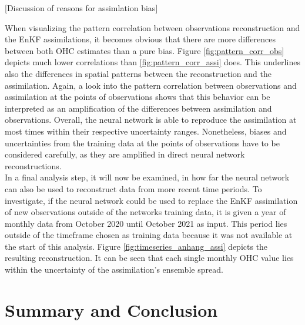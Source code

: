 \documentclass[11pt,a4paper]{scrreprt}	%
\begin{document}
	[Discussion of reasons for assimlation bias]
	
	When visualizing the pattern correlation between observations reconstruction and the EnKF assimilations, it becomes obvious that there are more differences between both OHC estimates than a pure bias. Figure \ref{fig:pattern_corr_obs} depicts much lower correlations than \ref{fig:pattern_corr_assi} does. This underlines also the differences in spatial patterns between the reconstruction and the assimilation. Again, a look into the pattern correlation between observations and assimilation at the points of observations shows that this behavior can be interpreted as an amplification of the differences between assimilation and observations. Overall, the neural network is able to reproduce the assimilation at most times within their respective uncertainty ranges. Nonetheless, biases and uncertainties from the training data at the points of observations have to be considered carefully, as they are amplified in direct neural network reconstructions. \\
 	In a final analysis step, it will now be examined, in how far the neural network can also be used to reconstruct data from more recent time periods. To investigate, if the neural network could be used to replace the EnKF assimilation of new observations outside of the networks training data, it is given a year of monthly data from October 2020 until October 2021 as input. This period lies outside of the timeframe chosen as training data because it was not available at the start of this analysis. Figure \ref{fig:timeseries_anhang_assi} depicts the resulting reconstruction. It can be seen that each single monthly OHC value lies within the uncertainty of the assimilation's ensemble spread.
 	
 	
 	\section{Summary and Conclusion}
 	
\end{document}

